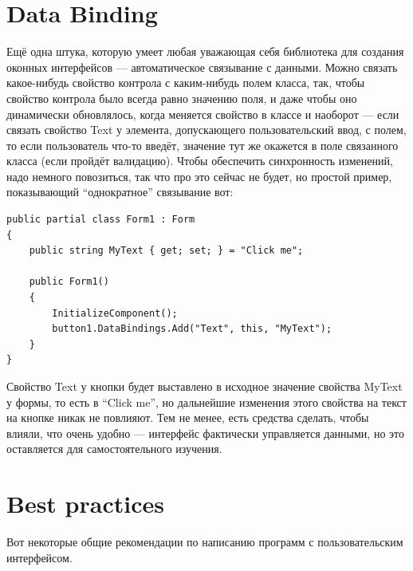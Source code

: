 \documentclass[a5paper]{article}
\begin{document}
\section{Data Binding}

Ещё одна штука, которую умеет любая уважающая себя библиотека для создания оконных интерфейсов --- автоматическое связывание с данными. Можно связать какое-нибудь свойство контрола с каким-нибудь полем класса, так, чтобы свойство контрола было всегда равно значению поля, и даже чтобы оно динамически обновлялось, когда меняется свойство в классе и наоборот --- если связать свойство Text у элемента, допускающего пользовательский ввод, с полем, то если пользователь что-то введёт, значение тут же окажется в поле связанного класса (если пройдёт валидацию). Чтобы обеспечить синхронность изменений, надо немного повозиться, так что про это сейчас не будет, но простой пример, показывающий ``однократное'' связывание вот:

\begin{verbatim}
public partial class Form1 : Form
{
    public string MyText { get; set; } = "Click me";

    public Form1()
    {
        InitializeComponent();
        button1.DataBindings.Add("Text", this, "MyText");
    }
}
\end{verbatim}

Свойство Text у кнопки будет выставлено в исходное значение свойства MyText у формы, то есть в ``Click me'', но дальнейшие изменения этого свойства на текст на кнопке никак не повлияют. Тем не менее, есть средства сделать, чтобы влияли, что очень удобно --- интерфейс фактически управляется данными, но это оставляется для самостоятельного изучения.

\section{Best practices}

Вот некоторые общие рекомендации по написанию программ с пользовательским интерфейсом.
\end{document}
